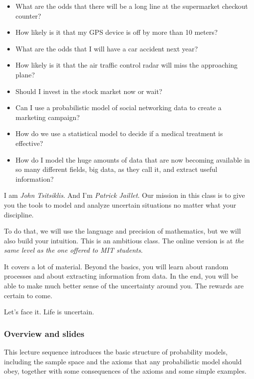 \documentclass[pdftex, brazil, 12pt, twoside]{article}
\begin{document}
\begin{itemize}[noitemsep]
\item What are the odds that there will
be a long line at the supermarket checkout counter?
\item How likely is it that my GPS device is off
by more than 10 meters?
\item What are the odds that I will have a car accident next year?
\item How likely is it that the air traffic control radar will
miss the approaching plane?
\item Should I invest in the stock market now or wait?
\item Can I use a probabilistic model of social networking data
to create a marketing campaign?
\item How do we use a statistical model
to decide if a medical treatment is effective?
\item How do I model the huge amounts of data that are now
becoming available in so many different fields, big data,
as they call it, and extract useful information?
\end{itemize}

I am \emph{John Tsitsiklis}.
And I'm \emph{Patrick Jaillet}.
Our mission in this class is to give you the tools
to model and analyze uncertain situations no matter what
your discipline.

To do that, we will use the language and precision
of mathematics, but we will also build your intuition.
This is an ambitious class.
The online version is at \emph{the same level as the one offered
  to MIT students}.

It covers a lot of material.
Beyond the basics, you will learn about random processes
and about extracting information from data.
In the end, you will be able to make much better sense
of the uncertainty around you.
The rewards are certain to come.

Let's face it.
Life is uncertain.

\subsubsection{Overview and slides}
\label{un1-lec1-overview}

This lecture sequence introduces the basic structure of probability models,
including the sample space and the axioms that any probabilistic model should obey,
together with some consequences of the axioms and some simple examples.
\end{document}
